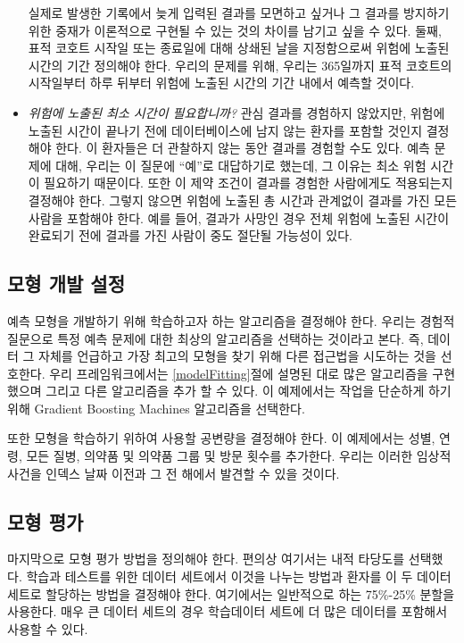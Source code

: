 \documentclass[11pt]{book}
\theoremstyle{definition}
\theoremstyle{definition}
\theoremstyle{definition}
\theoremstyle{remark}
\begin{document}
\begin{itemize}
  실제로 발생한 기록에서 늦게 입력된 결과를 모면하고 싶거나 그 결과를
  방지하기 위한 중재가 이론적으로 구현될 수 있는 것의 차이를 남기고 싶을
  수 있다. 둘째, 표적 코호트 시작일 또는 종료일에 대해 상쇄된 날을
  지정함으로써 위험에 노출된 시간의 기간 정의해야 한다. 우리의 문제를
  위해, 우리는 365일까지 표적 코호트의 시작일부터 하루 뒤부터 위험에
  노출된 시간의 기간 내에서 예측할 것이다.
\item
  \emph{위험에 노출된 최소 시간이 필요합니까?} 관심 결과를 경험하지
  않았지만, 위험에 노출된 시간이 끝나기 전에 데이터베이스에 남지 않는
  환자를 포함할 것인지 결정해야 한다. 이 환자들은 더 관찰하지 않는 동안
  결과를 경험할 수도 있다. 예측 문제에 대해, 우리는 이 질문에 ``예''로
  대답하기로 했는데, 그 이유는 최소 위험 시간이 필요하기 때문이다. 또한
  이 제약 조건이 결과를 경험한 사람에게도 적용되는지 결정해야 한다.
  그렇지 않으면 위험에 노출된 총 시간과 관계없이 결과를 가진 모든 사람을
  포함해야 한다. 예를 들어, 결과가 사망인 경우 전체 위험에 노출된 시간이
  완료되기 전에 결과를 가진 사람이 중도 절단될 가능성이 있다.
\end{itemize}

\subsection{모형 개발 설정}\label{--}

예측 모형을 개발하기 위해 학습하고자 하는 알고리즘을 결정해야 한다.
우리는 경험적 질문으로 특정 예측 문제에 대한 최상의 알고리즘을 선택하는
것이라고 본다. 즉, 데이터 그 자체를 언급하고 가장 최고의 모형을 찾기
위해 다른 접근법을 시도하는 것을 선호한다. 우리 프레임워크에서는
\ref{modelFitting}절에 설명된 대로 많은 알고리즘을 구현했으며 그리고
다른 알고리즘을 추가 할 수 있다. 이 예제에서는 작업을 단순하게 하기 위해
Gradient Boosting Machines 알고리즘을 선택한다.

또한 모형을 학습하기 위하여 사용할 공변량을 결정해야 한다. 이 예제에서는
성별, 연령, 모든 질병, 의약품 및 의약품 그룹 및 방문 횟수를 추가한다.
우리는 이러한 임상적 사건을 인덱스 날짜 이전과 그 전 해에서 발견할 수
있을 것이다.

\subsection{모형 평가}\label{-}

마지막으로 모형 평가 방법을 정의해야 한다. 편의상 여기서는 내적 타당도를
선택했다. 학습과 테스트를 위한 데이터 세트에서 이것을 나누는 방법과
환자를 이 두 데이터 세트로 할당하는 방법을 결정해야 한다. 여기에서는
일반적으로 하는 75\%-25\% 분할을 사용한다. 매우 큰 데이터 세트의 경우
학습데이터 세트에 더 많은 데이터를 포함해서 사용할 수 있다.
\end{document}
